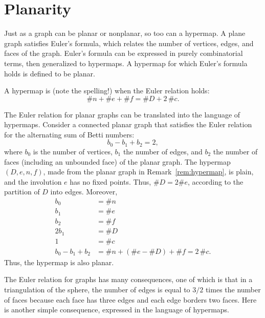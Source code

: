 \section{Planarity}
%
%

Just as a graph can be planar or nonplanar, so too can a hypermap.  A
plane graph satisfies Euler's formula, which relates the number of
vertices, edges, and faces of the graph.  Euler's formula can be
expressed in purely combinatorial terms, then generalized to
hypermaps.  A hypermap for which Euler's formula holds is defined to
be planar.  

\begin{definition}[planar]
A hypermap is  (note the
spelling!) when the Euler relation holds:
\[ \# n + \# e + \# f = \# D + 2\, \#c.\] 
%
\end{definition}


\begin{remark}\label{rem:Euler}
The Euler relation for planar graphs can be translated into the
language of hypermaps.  Consider a connected planar graph that
satisfies the Euler relation for the alternating sum of Betti
numbers:
\[ b_0 - b_1 + b_2 = 2,\]  where $b_0$
is the number of vertices, $b_1$ the number of edges, and $b_2$ the
number of faces (including an unbounded face) of the planar
graph. The hypermap $(D,e,n,f)$, made from the planar graph in
Remark~\ref{rem:hypermap}, is plain, and the involution $e$ has no fixed points.  
Thus, $\# D = 2\#e$, according to the partition of $D$ into edges.  Moreover,
\begin{align*}
b_0 &= \# n\\
b_1 &= \# e\\
b_2 &= \# f\\
2b_1 &= \# D\\
1 &= \#c\\
b_0 - b_1 + b_2  &= \# n + (\#e - \#D) + \# f = 2\,\# c.
\end{align*}
Thus, the hypermap is also planar.
\end{remark}


The Euler relation for graphs has many consequences, one of which is
 that in a triangulation of the sphere, the number of
edges is equal to $3/2$ times the number of faces because each face
has three edges and each edge borders two faces.  Here is another simple
consequence, expressed in the language of hypermaps.

